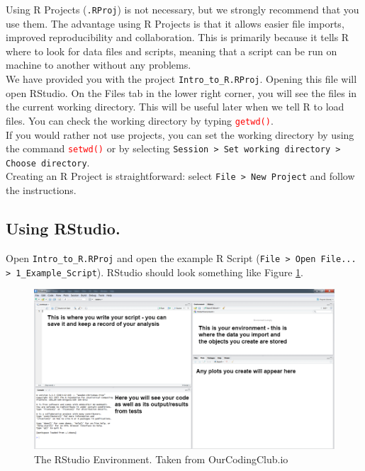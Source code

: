 \documentclass[a4paper,12pt]{article}
\newcommand\code[1]{\textcolor{red}{\texttt{#1}}}
\begin{document}
Using R Projects (\texttt{.RProj}) is not necessary, but we strongly recommend that you use them. The advantage using R Projects is that it allows easier file imports, improved reproducibility and collaboration. This is primarily because it tells R where to look for data files and scripts, meaning that a script can be run on machine to another without any problems. \\

We have provided you with the project \texttt{Intro\_to\_R.RProj}. Opening this file will open RStudio. On the Files tab in the lower right corner, you will see the files in the current working directory. This will be useful later when we tell R to load files. You can check the working directory by typing \code{getwd()}. \\

If you would rather not use projects, you can set the working directory by using the command \code{setwd()} or by selecting \texttt{Session > Set working directory > Choose directory}. \\

Creating an R Project is straightforward: select \texttt{File > New Project} and follow the instructions.


\subsection {Using RStudio.}

Open \texttt{Intro\_to\_R.RProj} and open the example R Script (\texttt{File > Open File... > 1\_Example\_Script}). RStudio should look something like Figure \ref{fig:R_Studio}. 
\\


\begin{figure}[h]
	\centering 
	\includegraphics[width=1.1\textwidth]{figs/R_Studio.png}
	\caption{The RStudio Environment. Taken from OurCodingClub.io}
	\label{fig:R_Studio}
\end{figure} 
\end{document}

